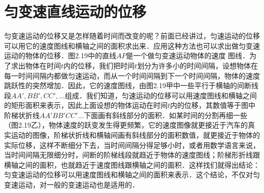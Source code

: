 \section{匀变速直线运动的位移}
匀变速运动的位移又是怎样随着时间而改变的呢？前面已经讲过，匀速运动的位移可以用它的速度图线和横轴之间的面积求出来．应用这种方法也可以求出做匀变速运动的物体的位移．图2.19中的直线$AP$是一个做匀变速运动物体的速度
图线．为了求出物体在时间$t$内的位移，我们把时间$t$划分为许多小的时间间隔，设想物体在每一时间间隔内都做匀速运动，而从一个时间间隔到下一个时间间隔，物体的速度跳跃性的突然增加．因此，它的速度图线，由图2.19甲中一些平行于横轴的间断线段$AA',BB',CC',\ldots$组成．我们知道，匀速运动的位移可以用速度图线和横轴之间的矩形面积来表示，因此上面设想的物体运动在时间$t$内的位移，其数值等于图中阶梯状折线$AA'BB'CC'\ldots$下面画有斜线部分的面积．如某时间的分割再细一些（图2.19乙），物体速度的跃变发生得更频繁，它的速度图像就更接近于汽车的真实运动的图像，阶梯状折线和横轴间画有斜线部分的面积数值，就更接近于物体的实际位移，这样不断细分下去，当时间间隔分得足够小时，或者用数学语言来说，当时间间隔无限细分时，间断的阶梯线段就趋近于物体的速度图线；阶梯形折线跟横轴之间的面积，也就趋近于速度图线跟横轴之间的面积．这样找们就得出结论：匀变速运动的位移可以用速度图线和横轴之间的面积来表示．这个结论，不仅对匀变速运动，对一般的变速运动也是适用的．

